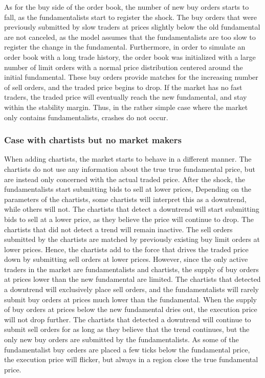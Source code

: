 As for the buy side of the order book, the number of new buy orders starts to fall, as the fundamentalists start to register the shock. The buy orders that were previously submitted by slow traders at prices slightly below the old fundamental are not canceled, as the model assumes that the fundamentalists are too slow to register the change in the fundamental. Furthermore, in order to simulate an order book with a long trade history, the order book was initialized with a large number of limit orders with a normal price distribution centered around the initial fundamental. These buy orders provide matches for the increasing number of sell orders, and the traded price begins to drop. If the market has no fast traders, the traded price will eventually reach the new fundamental, and stay within the stability margin. Thus, in the rather simple case where the market only contains fundamentalists, crashes do not occur. 

\subsubsection*{Case with chartists but no market makers}
When adding chartists, the market starts to behave in a different manner. The chartists do not use any information about the true true fundamental price, but are instead only concerned with the actual traded price. After the shock, the fundamentalists start submitting bids to sell at lower prices, Depending on the parameters of the chartists, some chartists will interpret this as a downtrend, while others will not. The chartists that detect a downtrend will start submitting bids to sell at a lower price, as they believe the price will continue to drop. The chartists that did not detect a trend will remain inactive. The sell orders submitted by  the chartists are matched by previously existing buy limit orders at lower prices. Hence, the chartists add to the force that drives the traded price down by submitting sell orders at lower prices. However, since the only active traders in the market are fundamentalists and chartists, the supply of buy orders at prices lower than the new fundamental are limited. The chartists that detected a downtrend will exclusively place sell orders, and the fundamentalists will rarely submit buy orders at prices much lower than the fundamental. When the supply of buy orders at prices below the new fundamental dries out, the execution price will not drop further. The chartists that detected a downtrend will continue to submit sell orders for as long as they believe that the trend continues, but the only new buy orders are submitted by the fundamentalists. As some of the fundamentalist buy orders are placed a few ticks below the fundamental price, the execution price will flicker, but always in a region close the true fundamental price.

